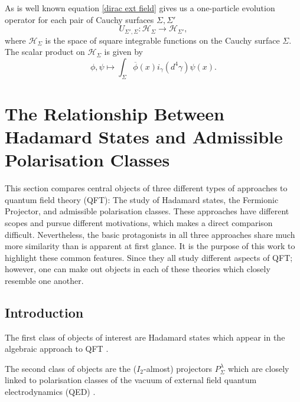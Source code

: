 \documentclass[b5paper,draft,openbib,12pt]{memoir}
\begin{document}
As is well known equation \eqref{dirac ext field} gives us a 
one-particle evolution operator for each pair of Cauchy surfaces \(\Sigma, \Sigma'\)
\begin{equation}
U_{\Sigma',\Sigma}:\mathcal{H}_\Sigma \rightarrow \mathcal{H}_{\Sigma'},
\end{equation}
where \(\mathcal{H}_\Sigma\) is the space of square integrable functions on the Cauchy surface \(\Sigma\). The scalar product on \(\mathcal{H}_\Sigma\)
is given by
\begin{equation}
\phi,\psi \mapsto \int_{\Sigma} \overline{\phi}(x) i_{\gamma}(d^4\gamma) \psi(x).
\end{equation}





\section{The Relationship Between Hadamard States and Admissible Polarisation Classes}



This section compares central objects of three different types of approaches to quantum field theory (QFT): The study of Hadamard states, the
Fermionic Projector, and admissible polarisation classes.
These approaches have different scopes and pursue different motivations, which makes a direct comparison difficult.
Nevertheless, the basic protagonists in all three approaches share much more similarity than is apparent at first glance.
It is the purpose of this work to highlight these common features. 
Since they all study different aspects of QFT; however, one can make out objects in each of these theories which closely resemble
one another. 

\subsection{Introduction}


The first class of objects of interest are Hadamard states which appear in the algebraic approach to 
QFT \cite{fulling1978singularity}. 


The second class of objects are the (\(I_2\)-almost) projectors \(P^\lambda_{\Sigma}\) which are 
closely linked to polarisation classes of the vacuum of external field quantum electrodynamics (QED) \cite{ivp0, ivp1, ivp2}. 
\end{document}
